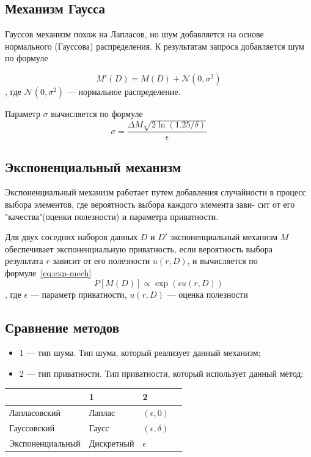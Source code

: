 \subsection{Механизм Гаусса} 
Гауссов механизм похож на Лапласов, но шум добавляется на основе нормального (Гауссова) распределения.
К результатам запроса добавляется шум по формуле%

\begin{equation}\label{eq:gauss-norm}
	M'(D) = M(D) + \mathcal{N}(0, \sigma^2)
\end{equation}
, где $\mathcal{N}(0, \sigma^2)$ --- нормальное распределение.

Параметр $\sigma$ вычисляется по формуле%
\begin{equation}\label{eq:gauss-sigma}
	\sigma = \frac{\Delta M \sqrt{2 \ln(1.25/\delta)}}{\epsilon}
\end{equation}

\subsection{Экспоненциальный механизм}
Экспоненциальный механизм работает путем добавления случайности в
процесс выбора элементов, где вероятность выбора каждого элемента зави-
сит от его "качества"(оценки полезности) и параметра приватности.

Для двух соседних наборов данных $D$ и $D'$  экспоненциальный механизм $M$ обеспечивает экспоненциальную приватность, если вероятность выбора результата $r$ зависит от его полезности $u(r, D)$, и вычисляется по формуле~\ref{eq:exp-mech}
\begin{equation}\label{eq:exp-mech}
	P[M(D)] \propto \exp(\epsilon  u(r, D))
\end{equation}
, где $\epsilon$ --- параметр приватности, $u(r, D)$ --- оценка полезности


\subsection{Сравнение методов}
\begin{itemize}[label*=---]
	\item 1 ---  тип шума. Тип шума, который реализует данный механизм;
	\item 2 --- тип приватности. Тип приватности, который использует данный метод;
\end{itemize}

\begin{tabularx}{0.8\textwidth}{|X|X|X|X|}  %
	\hline
	\space & 1 & 2\\
	\hline
	Лапласовский& Лаплас & $(\epsilon, 0)$\\
	\hline
	Гауссовский & Гаусс & $(\epsilon, \delta)$ \\
	\hline
	Экспоненциальный& Дискретный & $\epsilon$\\
	\hline
\end{tabularx}

